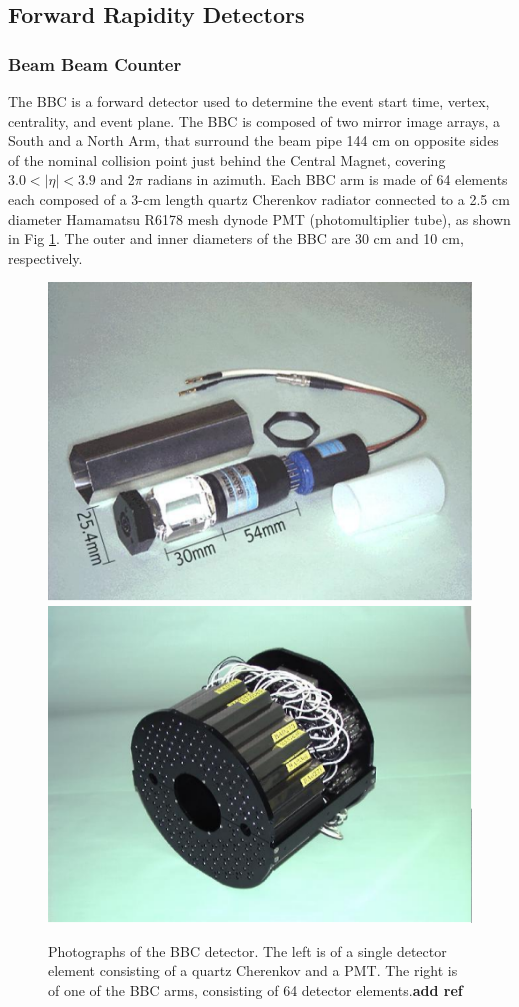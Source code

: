\subsection{Forward Rapidity Detectors}
\subsubsection{Beam Beam Counter}
The BBC is a forward detector used to determine the event start time, vertex, centrality, and event plane. The BBC is composed of two mirror image arrays, a South and a North Arm, that surround the beam pipe 144 cm on opposite sides of the nominal collision point just behind the Central Magnet, covering $3.0 < |\eta| < 3.9$ and 2$\pi$ radians in azimuth. Each BBC arm is made of 64 elements each composed of a 3-cm length quartz Cherenkov radiator connected to a 2.5 cm diameter Hamamatsu R6178 mesh dynode PMT (photomultiplier tube), as shown in Fig \ref{fig:bbc_dector}. The outer and inner diameters of the BBC are 30 cm and 10 cm, respectively.%
\begin{figure}[!ht]
\begin{center}
\includegraphics[width=0.5\linewidth]{figs/bbc_pmt.png}
\includegraphics[width=0.5\linewidth]{figs/bbc_arm.png}
\caption{Photographs of the BBC detector. The left is of a single detector element consisting of a quartz Cherenkov and a PMT. The right is of one of the BBC arms, consisting of 64 detector elements.\textbf{add ref}}
\label{fig:bbc_dector}
\end{center}
\end{figure}

